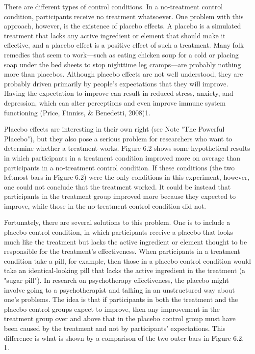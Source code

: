 There are different types of control conditions. In a no-treatment control condition, participants receive no treatment whatsoever. One problem with this approach, however, is the existence of placebo effects. A placebo is a simulated treatment that lacks any active ingredient or element that should make it effective, and a placebo effect is a positive effect of such a treatment. Many folk remedies that seem to work---such as eating chicken soup for a cold or placing soap under the bed sheets to stop nighttime leg cramps---are probably nothing more than placebos. Although placebo effects are not well understood, they are probably driven primarily by people's expectations that they will improve. Having the expectation to improve can result in reduced stress, anxiety, and depression, which can alter perceptions and even improve immune system functioning (Price, Finniss, \& Benedetti, 2008)1.

Placebo effects are interesting in their own right (see Note "The Powerful Placebo"), but they also pose a serious problem for researchers who want to determine whether a treatment works. Figure 6.2 shows some hypothetical results in which participants in a treatment condition improved more on average than participants in a no-treatment control condition. If these conditions (the two leftmost bars in Figure 6.2) were the only conditions in this experiment, however, one could not conclude that the treatment worked. It could be instead that participants in the treatment group improved more because they expected to improve, while those in the no-treatment control condition did not.

Fortunately, there are several solutions to this problem. One is to include a placebo control condition, in which participants receive a placebo that looks much like the treatment but lacks the active ingredient or element thought to be responsible for the treatment's effectiveness. When participants in a treatment condition take a pill, for example, then those in a placebo control condition would take an identical-looking pill that lacks the active ingredient in the treatment (a "sugar pill"). In research on psychotherapy effectiveness, the placebo might involve going to a psychotherapist and talking in an unstructured way about one's problems. The idea is that if participants in both the treatment and the placebo control groups expect to improve, then any improvement in the treatment group over and above that in the placebo control group must have been caused by the treatment and not by participants' expectations. This difference is what is shown by a comparison of the two outer bars in Figure 6.2.
1. 

